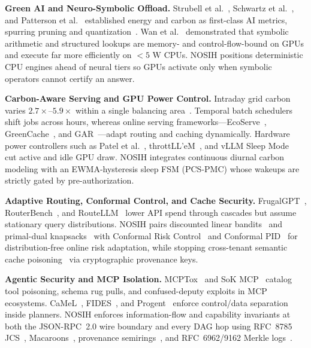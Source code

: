 \documentclass[10pt,twocolumn,letterpaper]{article}
\begin{document}
\textbf{Green AI and Neuro-Symbolic Offload.} Strubell et al.~\cite{strubell2019energy}, Schwartz et al.~\cite{schwartz2020greenai}, and Patterson et al.~\cite{patterson2021carbon} established energy and carbon as first-class AI metrics, spurring pruning and quantization~\cite{han2016deep}. Wan et al.~\cite{wan2024neurosymbolic} demonstrated that symbolic arithmetic and structured lookups are memory- and control-flow-bound on GPUs and execute far more efficiently on $<5\text{ W}$ CPUs. NOSIH positions deterministic CPU engines ahead of neural tiers so GPUs activate only when symbolic operators cannot certify an answer.

\textbf{Carbon-Aware Serving and GPU Power Control.} Intraday grid carbon varies $2.7\times\text{--}5.9\times$ within a single balancing area~\cite{carbonrouter2026}. Temporal batch schedulers~\cite{radovanovic2022carbon,wiesner2021wait} shift jobs across hours, whereas online serving frameworks—EcoServe~\cite{li2025ecoserve}, GreenCache~\cite{tian2025greencache}, and GAR~\cite{sheshanarayana2026gar}—adapt routing and caching dynamically. Hardware power controllers such as Patel et al.~\cite{patel2024power}, throttLL'eM~\cite{kakolyris2025throttllem}, and vLLM Sleep Mode~\cite{vllm2025sleep} cut active and idle GPU draw. NOSIH integrates continuous diurnal carbon modeling with an EWMA-hysteresis sleep FSM (PCS-PMC) whose wakeups are strictly gated by pre-authorization.

\textbf{Adaptive Routing, Conformal Control, and Cache Security.} FrugalGPT~\cite{chen2024frugalgpt}, RouterBench~\cite{hu2024routerbench}, and RouteLLM~\cite{ong2025routellm} lower API spend through cascades but assume stationary query distributions. NOSIH pairs discounted linear bandits~\cite{russac2019dlinucb} and primal-dual knapsacks~\cite{agrawal2016lincbwk} with Conformal Risk Control~\cite{angelopoulos2024crc} and Conformal PID~\cite{angelopoulos2023pid} for distribution-free online risk adaptation, while stopping cross-tenant semantic cache poisoning~\cite{wu2026cachepoison} via cryptographic provenance keys.

\textbf{Agentic Security and MCP Isolation.} MCPTox~\cite{wang2025mcptox} and SoK MCP~\cite{gaire2025sok} catalog tool poisoning, schema rug pulls, and confused-deputy exploits in MCP ecosystems. CaMeL~\cite{debenedetti2025camel}, FIDES~\cite{costa2025fides}, and Progent~\cite{shi2025progent} enforce control/data separation inside planners. NOSIH enforces information-flow and capability invariants at both the JSON-RPC~2.0 wire boundary and every DAG hop using RFC~8785 JCS~\cite{rfc8785}, Macaroons~\cite{birgisson2014macaroons}, provenance semirings~\cite{green2007semirings}, and RFC~6962/9162 Merkle logs~\cite{rfc6962,rfc9162}.
\end{document}
